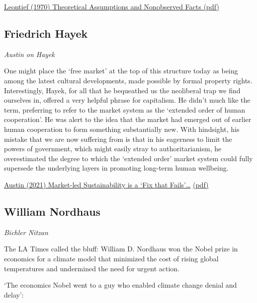 \documentclass[
]{book}
\begin{document}
\href{pdf/Leontief_1970_Theoretical_Assumptions_and_Nonobserved_Facts.pdf}{Leontief (1970) Theoretical Assumptions and Nonobserved Facts (pdf)}

\hypertarget{friedrich-hayek}{%
\subsection{Friedrich Hayek}\label{friedrich-hayek}}

\emph{Austin on Hayek}

One might place the `free market' at the top of this structure today as being among the latest cultural
developments, made possible by formal property rights. Interestingly, Hayek, for all that he
bequeathed us the neoliberal trap we find ourselves in, offered a very helpful phrase for capitalism.
He didn't much like the term, preferring to refer to the market system as the `extended order of
human cooperation'. He was alert to the idea that the
market had emerged out of earlier human cooperation to form something substantially new. With
hindsight, his mistake that we are now suffering from is that in his eagerness to limit the powers of
government, which might easily stray to authoritarianism, he overestimated the degree to which the
`extended order' market system could fully supersede the underlying layers in promoting long-term
human wellbeing.

\href{https://bothbrainsrequire\%20d.com/2021/10/25/fix-that-fails/}{Austin (2021) Market-led Sustainability is a `Fix that Fails'\ldots{}}
\href{pdf/Austin_2021_Market_Led_Sustainability_Fix_Fails.pdf}{(pdf)}

\hypertarget{william-nordhaus}{%
\subsection{William Nordhaus}\label{william-nordhaus}}

\emph{Bichler Nitzan}

The LA Times called the bluff: William D. Nordhaus won the Nobel prize in economics for a climate model that minimized the cost of rising global temperatures and undermined the need for urgent action.

`The economics Nobel went to a guy who enabled climate change denial and delay':
\end{document}
